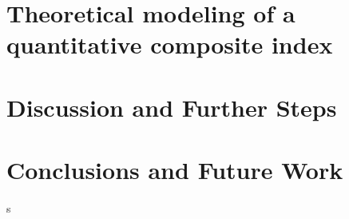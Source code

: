 \documentclass{llncs}
\begin{document}
\section{Theoretical modeling of a quantitative composite index}

 \section{Discussion and Further Steps}

\section{Conclusions and Future Work}
s%



\appendix




\end{document}
